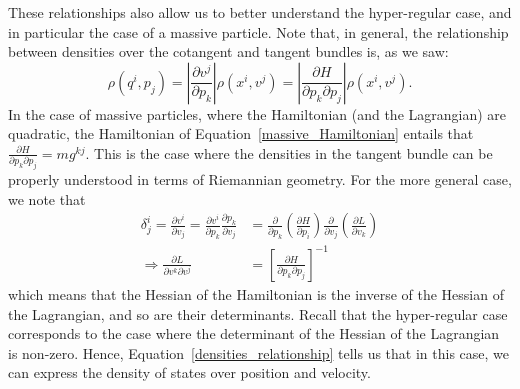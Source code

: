 \documentclass[letterpaper]{article}
\begin{document}
These relationships also allow us to better understand the hyper-regular case, and in particular the case of a massive particle. Note that, in general, the relationship between densities over the cotangent and tangent bundles is, as we saw:
\begin{equation} \label{densities_relationship}
\rho(q^i, p_j) = \left|\frac{\partial v^j}{\partial p_k}\right| \rho(x^i, v^j)  = \left|\frac{\partial H}{\partial p_k \partial p_j}\right| \rho(x^i, v^j).
\end{equation}
In the case of massive particles, where the Hamiltonian (and the Lagrangian) are quadratic, the Hamiltonian of Equation~\ref{massive_Hamiltonian} entails that $\frac{\partial H}{\partial p_k \partial p_j} = m g^{kj}$. This is the case where the densities in the tangent bundle can be properly understood in terms of Riemannian geometry. For the more general case, we note that
\begin{equation}
\begin{aligned}
\delta^i_j = \frac{\partial v^i}{\partial v_j} = \frac{\partial v^i}{\partial p_k}\frac{\partial p_k}{\partial v_j} &= \frac{\partial}{\partial p_k}\left(\frac{\partial H}{\partial p_i}\right) \frac{\partial }{\partial v_j} \left( \frac{\partial L}{\partial v_k} \right) \\
\Rightarrow \frac{\partial L}{\partial v^k \partial v^j} &= \left[ \frac{\partial H}{\partial p_k \partial p_j} \right]^{-1}
\end{aligned}
\end{equation}
which means that the Hessian of the Hamiltonian is the inverse of the Hessian of the Lagrangian, and so are their determinants. Recall that the hyper-regular case corresponds to the case where the determinant of the Hessian of the Lagrangian is non-zero. Hence, Equation~\ref{densities_relationship} tells us that in this case, we can express the density of states over position and velocity.


\end{document}
